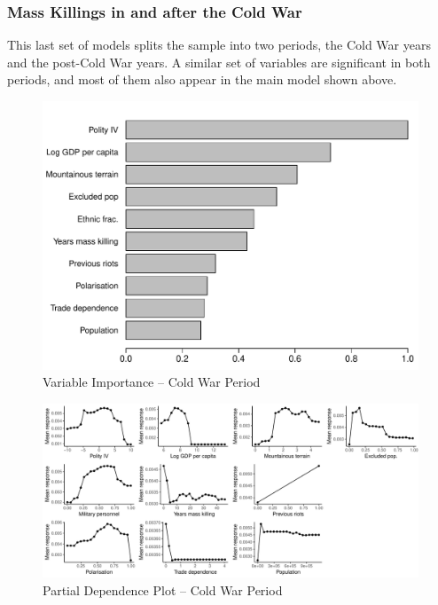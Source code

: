 \newpage

\subsubsection{Mass Killings in and after the Cold War}

This last set of models splits the sample into two periods, the Cold War years and the post-Cold War years. A similar set of variables are significant in both periods, and most of them also appear in the main model shown above. 

\begin{figure}[H]
    \centering
    \includegraphics[width=.85\textwidth]{images/rf-coldwar.pdf}
    \caption{Variable Importance -- Cold War Period}
    \label{fig:rf-coldwar}
\end{figure}

\newpage

\clearpage
\begin{figure}
    \includegraphics[width=\textwidth]{images/rf-coldwar-pd.pdf}
    \caption{Partial Dependence Plot -- Cold War Period}
    \label{fig:rf-coldwar2}
\end{figure}
\clearpage

